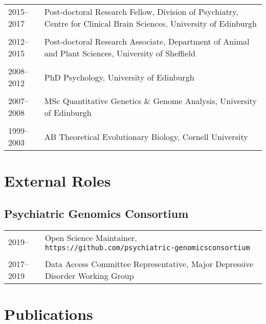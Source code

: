 \documentclass[11pt]{article}
\begin{document}
\begin{tabular}{p{3cm}p{12cm}}
2015--2017 & Post-doctoral Research Fellow, Division of Psychiatry, Centre for Clinical Brain Sciences, University of Edinburgh \\ \\

2012--2015 & Post-doctoral Research Associate, Department of Animal and Plant Sciences, University of Sheffield \\ \\

2008--2012 & PhD Psychology, University of Edinburgh \\ \\

2007--2008 & MSc Quantitative Genetics \& Genome Analysis, University of Edinburgh \\ \\

1999–2003 & AB Theoretical Evolutionary Biology, Cornell University

\end{tabular}

\section*{External Roles}

\subsection*{Psychiatric Genomics Consortium}

\begin{tabular}{p{3cm}p{12cm}}
2019-- & Open Science Maintainer, \texttt{https://github.com/psychiatric-genomics\-consortium} \\ \\

2017--2019 & Data Access Committee Representative, Major Depressive Disorder Working Group 

\end{tabular}

\newpage

\section*{Publications}

\nocite{*}

\setlength\bibhang{0pt}

% 
\end{document}
